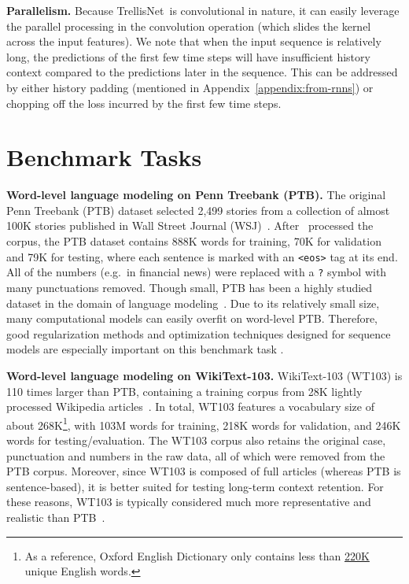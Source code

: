 \documentclass{article} \usepackage{iclr2019_conference,times}
\newcommand\mypara[1]{\vspace{0mm}\noindent\textbf{#1}}
\newcommand{\model}{TrellisNet}
\begin{document}
\mypara{Parallelism.} Because \model~is convolutional in nature, it can easily leverage the parallel processing in the convolution operation (which slides the kernel across the input features). We note that when the input sequence is relatively long, the predictions of the first few time steps will have insufficient history context compared to the predictions later in the sequence. This can be addressed by either history padding (mentioned in Appendix~\ref{appendix:from-rnns}) or chopping off the loss incurred by the first few time steps.


\section{Benchmark Tasks}
\label{appendix:task-description}

\mypara{Word-level language modeling on Penn Treebank (PTB).} The original Penn Treebank (PTB) dataset selected 2,499 stories from a collection of almost 100K stories published in Wall Street Journal (WSJ)~\citep{Marcus93buildinga}. After \cite{Mikolov2010PTB}~processed the corpus, the PTB dataset contains 888K words for training, 70K for validation and 79K for testing, where each sentence is marked with an \texttt{<eos>} tag at its end. All of the numbers (e.g.\ in financial news) were replaced with a \texttt{?} symbol with many punctuations removed. Though small, PTB has been a highly studied dataset in the domain of language modeling~\citep{miyamoto2016gated,zilly2017recurrent,merityRegOpt,Melis2018,yang2018breaking}.
Due to its relatively small size, many computational models can easily overfit on word-level PTB. Therefore, good regularization methods and optimization techniques designed for sequence models are especially important on this benchmark task \citep{merityRegOpt}.

\mypara{Word-level language modeling on WikiText-103.}
WikiText-103 (WT103) is 110 times larger than PTB, containing a training corpus from 28K lightly processed Wikipedia articles~\citep{merity2016pointer}. In total, WT103 features a vocabulary size of about 268K\footnote{As a reference, Oxford English Dictionary only contains less than \href{https://en.oxforddictionaries.com/explore/how-many-words-are-there-in-the-english-language/}{220K} unique English words.}, with 103M words for training, 218K words for validation, and 246K words for testing/evaluation. The WT103 corpus also retains the original case, punctuation and numbers in the raw data, all of which were removed from the PTB corpus. Moreover, since WT103 is composed of full articles (whereas PTB is sentence-based), it is better suited for testing long-term context retention. For these reasons, WT103 is typically considered much more representative and realistic than PTB~\citep{merity2018analysis}.
\end{document}
